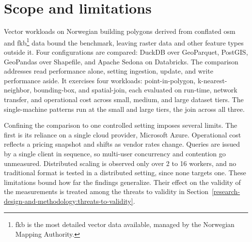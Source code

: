 \section{Scope and limitations}
\label{introduction:scope-and-limitations}
Vector workloads on Norwegian building polygons derived from conflated \acrshort{osm} and \acrfull{fkb}\footnote{\acrshort{fkb} is the most detailed vector data available, managed by the Norwegian Mapping Authority.} data bound the benchmark, leaving raster data and other feature types outside it. Four configurations are compared: DuckDB over GeoParquet, PostGIS, GeoPandas over Shapefile, and Apache Sedona on Databricks. The comparison addresses read performance alone, setting ingestion, update, and write performance aside. It exercises four workloads: point-in-polygon, k-nearest-neighbor, bounding-box, and spatial-join, each evaluated on run-time, network transfer, and operational cost across small, medium, and large dataset tiers. The single-machine patterns run at the small and large tiers, the join across all three.

Confining the comparison to one controlled setting imposes several limits. The first is its reliance on a single cloud provider, Microsoft Azure. Operational cost reflects a pricing snapshot and shifts as vendor rates change. Queries are issued by a single client in sequence, so multi-user concurrency and contention go unmeasured. Distributed scaling is observed only over 2 to 16 workers, and no traditional format is tested in a distributed setting, since none targets one. These limitations bound how far the findings generalize. Their effect on the validity of the measurements is treated among the threats to validity in Section~\ref{research-design-and-methodology:threats-to-validity}.